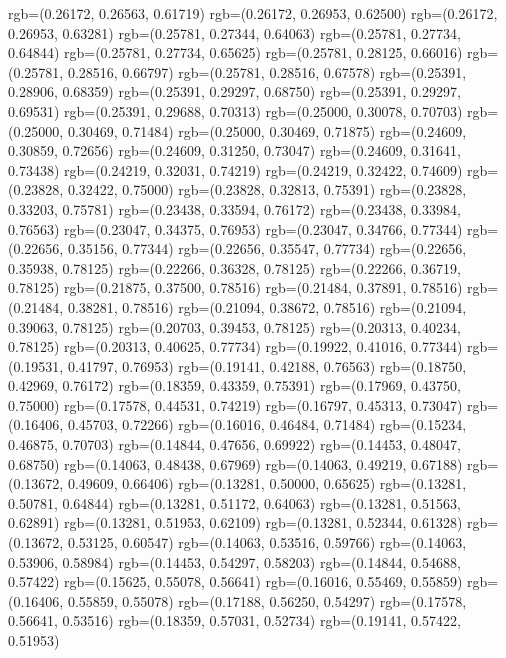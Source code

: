 {{{			rgb=(0.26172, 0.26563, 0.61719)
			rgb=(0.26172, 0.26953, 0.62500)
			rgb=(0.26172, 0.26953, 0.63281)
			rgb=(0.25781, 0.27344, 0.64063)
			rgb=(0.25781, 0.27734, 0.64844)
			rgb=(0.25781, 0.27734, 0.65625)
			rgb=(0.25781, 0.28125, 0.66016)
			rgb=(0.25781, 0.28516, 0.66797)
			rgb=(0.25781, 0.28516, 0.67578)
			rgb=(0.25391, 0.28906, 0.68359)
			rgb=(0.25391, 0.29297, 0.68750)
			rgb=(0.25391, 0.29297, 0.69531)
			rgb=(0.25391, 0.29688, 0.70313)
			rgb=(0.25000, 0.30078, 0.70703)
			rgb=(0.25000, 0.30469, 0.71484)
			rgb=(0.25000, 0.30469, 0.71875)
			rgb=(0.24609, 0.30859, 0.72656)
			rgb=(0.24609, 0.31250, 0.73047)
			rgb=(0.24609, 0.31641, 0.73438)
			rgb=(0.24219, 0.32031, 0.74219)
			rgb=(0.24219, 0.32422, 0.74609)
			rgb=(0.23828, 0.32422, 0.75000)
			rgb=(0.23828, 0.32813, 0.75391)
			rgb=(0.23828, 0.33203, 0.75781)
			rgb=(0.23438, 0.33594, 0.76172)
			rgb=(0.23438, 0.33984, 0.76563)
			rgb=(0.23047, 0.34375, 0.76953)
			rgb=(0.23047, 0.34766, 0.77344)
			rgb=(0.22656, 0.35156, 0.77344)
			rgb=(0.22656, 0.35547, 0.77734)
			rgb=(0.22656, 0.35938, 0.78125)
			rgb=(0.22266, 0.36328, 0.78125)
			rgb=(0.22266, 0.36719, 0.78125)
			rgb=(0.21875, 0.37500, 0.78516)
			rgb=(0.21484, 0.37891, 0.78516)
			rgb=(0.21484, 0.38281, 0.78516)
			rgb=(0.21094, 0.38672, 0.78516)
			rgb=(0.21094, 0.39063, 0.78125)
			rgb=(0.20703, 0.39453, 0.78125)
			rgb=(0.20313, 0.40234, 0.78125)
			rgb=(0.20313, 0.40625, 0.77734)
			rgb=(0.19922, 0.41016, 0.77344)
			rgb=(0.19531, 0.41797, 0.76953)
			rgb=(0.19141, 0.42188, 0.76563)
			rgb=(0.18750, 0.42969, 0.76172)
			rgb=(0.18359, 0.43359, 0.75391)
			rgb=(0.17969, 0.43750, 0.75000)
			rgb=(0.17578, 0.44531, 0.74219)
			rgb=(0.16797, 0.45313, 0.73047)
			rgb=(0.16406, 0.45703, 0.72266)
			rgb=(0.16016, 0.46484, 0.71484)
			rgb=(0.15234, 0.46875, 0.70703)
			rgb=(0.14844, 0.47656, 0.69922)
			rgb=(0.14453, 0.48047, 0.68750)
			rgb=(0.14063, 0.48438, 0.67969)
			rgb=(0.14063, 0.49219, 0.67188)
			rgb=(0.13672, 0.49609, 0.66406)
			rgb=(0.13281, 0.50000, 0.65625)
			rgb=(0.13281, 0.50781, 0.64844)
			rgb=(0.13281, 0.51172, 0.64063)
			rgb=(0.13281, 0.51563, 0.62891)
			rgb=(0.13281, 0.51953, 0.62109)
			rgb=(0.13281, 0.52344, 0.61328)
			rgb=(0.13672, 0.53125, 0.60547)
			rgb=(0.14063, 0.53516, 0.59766)
			rgb=(0.14063, 0.53906, 0.58984)
			rgb=(0.14453, 0.54297, 0.58203)
			rgb=(0.14844, 0.54688, 0.57422)
			rgb=(0.15625, 0.55078, 0.56641)
			rgb=(0.16016, 0.55469, 0.55859)
			rgb=(0.16406, 0.55859, 0.55078)
			rgb=(0.17188, 0.56250, 0.54297)
			rgb=(0.17578, 0.56641, 0.53516)
			rgb=(0.18359, 0.57031, 0.52734)
			rgb=(0.19141, 0.57422, 0.51953)
}}}
